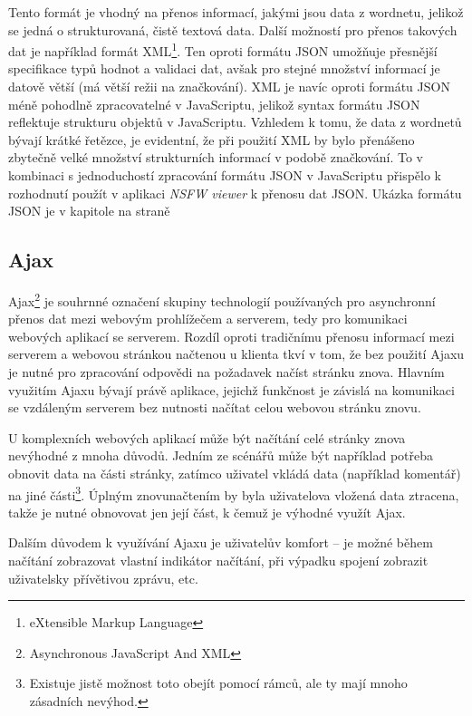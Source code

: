 \documentclass[a4paper, 11pt, oneside]{book}
\newcommand{\simplywn}{\textit{NSFW viewer} }
\newcommand{\itNameRef}[1]{\textit{\nameref{#1}}}
\begin{document}
					Tento formát je vhodný na přenos informací, jakými jsou data z wordnetu, jelikož se jedná o strukturovaná, čistě textová data. Další možností pro přenos takových dat je například formát XML\footnote{eXtensible Markup Language}. Ten oproti formátu JSON umožňuje přesnější specifikace typů hodnot a validaci dat, avšak pro stejné množství informací je datově větší (má větší režii na značkování). XML je navíc oproti formátu JSON méně pohodlně zpracovatelné v JavaScriptu, jelikož syntax formátu JSON reflektuje strukturu objektů v JavaScriptu. Vzhledem k tomu, že data z wordnetů bývají krátké řetězce, je evidentní, že při použití XML by bylo přenášeno zbytečně velké množství strukturních informací v podobě značkování. \parencite{jsonVsXML} To v kombinaci s jednoduchostí zpracování formátu JSON v JavaScriptu přispělo k rozhodnutí použít v aplikaci \simplywn k přenosu dat JSON. Ukázka formátu JSON je v kapitole \itNameRef{cha:answerStruct} na straně \pageref{cha:answerStruct}

				\subsection{Ajax}

					Ajax\footnote{Asynchronous JavaScript And XML} je souhrnné označení skupiny technologií používaných pro asynchronní přenos dat mezi webovým prohlížečem a serverem, tedy pro komunikaci webových aplikací se serverem. Rozdíl oproti tradičnímu přenosu informací mezi serverem a webovou stránkou načtenou u klienta tkví v tom, že bez použití Ajaxu je nutné pro zpracování odpovědi na požadavek načíst stránku znova. Hlavním využitím Ajaxu bývají právě aplikace, jejichž funkčnost je závislá na komunikaci se vzdáleným serverem bez nutnosti načítat celou webovou stránku znovu. \parencite{garrett2005ajax}

					U komplexních webových aplikací může být načítání celé stránky znova nevýhodné z mnoha důvodů. Jedním ze scénářů může být například potřeba obnovit data na části stránky, zatímco uživatel vkládá data (například komentář) na jiné části\footnote{Existuje jistě možnost toto obejít pomocí rámců, ale ty mají mnoho zásadních nevýhod.}. Úplným znovunačtením by byla uživatelova vložená data ztracena, takže je nutné obnovovat jen její část, k čemuž je výhodné využít Ajax.

					Dalším důvodem k využívání Ajaxu je uživatelův komfort -- je možné během načítání zobrazovat vlastní indikátor načítání, při výpadku spojení zobrazit uživatelsky přívětivou zprávu, etc.
\end{document}
